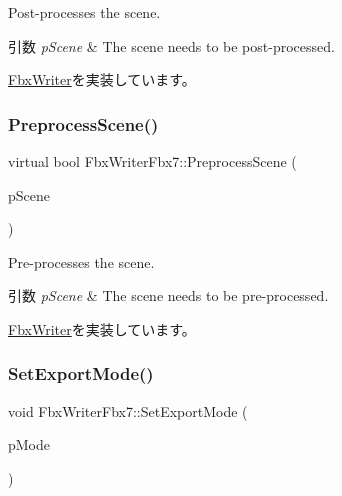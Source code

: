 Post-\/processes the scene. 
\begin{DoxyParams}{引数}
{\em p\+Scene} & The scene needs to be post-\/processed. \\
\hline
\end{DoxyParams}


\hyperlink{class_fbx_writer_a1cfdf59f72ebe777484862e4b64b5d65}{Fbx\+Writer}を実装しています。

\mbox{\label{class_fbx_writer_fbx7_a0eac2567b63f4fa72b8d1a6c56d5cb1c}} 
\subsubsection{\texorpdfstring{Preprocess\+Scene()}{PreprocessScene()}}
{\footnotesize\ttfamily virtual bool Fbx\+Writer\+Fbx7\+::\+Preprocess\+Scene (\begin{DoxyParamCaption}\item[{\hyperlink{class_fbx_scene}{Fbx\+Scene} \&}]{p\+Scene }\end{DoxyParamCaption})\hspace{0.3cm}{\ttfamily [virtual]}}

Pre-\/processes the scene. 
\begin{DoxyParams}{引数}
{\em p\+Scene} & The scene needs to be pre-\/processed. \\
\hline
\end{DoxyParams}


\hyperlink{class_fbx_writer_a0fd62ec785e7108924975591ee8fbf30}{Fbx\+Writer}を実装しています。

\mbox{\label{class_fbx_writer_fbx7_aaa8b395c07a3ded65291060522d06848}} 
\subsubsection{\texorpdfstring{Set\+Export\+Mode()}{SetExportMode()}}
{\footnotesize\ttfamily void Fbx\+Writer\+Fbx7\+::\+Set\+Export\+Mode (\begin{DoxyParamCaption}\item[{\hyperlink{class_fbx_writer_fbx7_a07b7bcbb11c9befcbd0eacd265458005}{E\+Export\+Mode}}]{p\+Mode }\end{DoxyParamCaption})}

